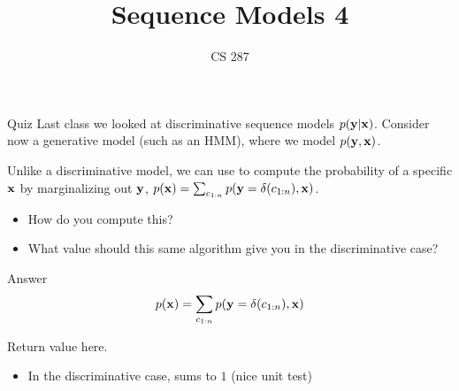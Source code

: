 \documentclass{beamer}
\title{Sequence Models 4}
\date{}
\author{CS 287}
\def\Lattice{
    \matrix (network)
    [matrix of nodes,
    nodes in empty cells,
    ampersand replacement=\&,
    column sep={1cm},
    row sep={0.1cm},
    nodes={outer sep=0pt,circle,minimum size=0.5cm, minimum width=1.3cm,draw, rectangle} ]
    {
     O \& O \& O \& O \& O\\
     I-PER \& I-PER \& I-PER \& I-PER \& I-PER \\ 
     I-ORG \& I-ORG \& I-ORG \& I-ORG \& I-ORG \\ 
     I-LOC \& I-LOC \& I-LOC \& I-LOC \& I-LOC \\ 
     |[draw=none]| \\
     |[draw=none]| Mayor \& |[draw=none]| DeBlasio \& |[draw=none]| from \& |[draw=none]| New  \& |[draw=none]| York  \\  
};
}
\begin{document}
\begin{frame}
  \titlepage
\end{frame}

\begin{frame}{}
  
\end{frame}


\begin{frame}{Quiz}
  Last class we looked at discriminative sequence models 
  $p(\mathbf{y} | \mathbf{x})$. Consider now a generative model (such as 
  an HMM), where we model $p(\mathbf{y}, \mathbf{x})$. 

  Unlike a discriminative model, we can use to compute the probability of a specific $\mathbf{x}$ by marginalizing out $\mathbf{y}$, $p(\mathbf{x}) = \sum_{c_{1:n}} p(\mathbf{y} = \delta(c_{1:n}), \mathbf{x})$. 


  \begin{itemize}
  \item How do you compute this?
    \air
  \item What value should this same algorithm give you in the discriminative case?
  \end{itemize}
\end{frame}

\begin{frame}{Answer}
  \[p(\mathbf{x}) = \sum_{c_{1:n}} p(\mathbf{y} = \delta(c_{1:n}), \mathbf{x})\]

  Return value here. 

  \begin{algorithmic}
    \EndFor{}
    \EndFor{}
    \EndProcedure{}
  \end{algorithmic}

  \begin{itemize}
  \item In the discriminative case, sums to $1$ (nice unit test)
  \end{itemize}
\end{frame}
\end{document}
